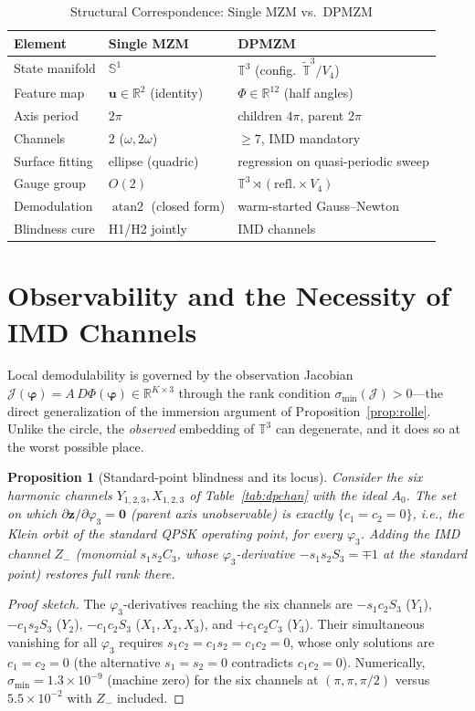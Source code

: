 \documentclass[journal]{IEEEtran}
\newtheorem{proposition}{Proposition}
\newcommand{\zv}{\mathbf{z}}
\newcommand{\uv}{\mathbf{u}}
\newcommand{\phiv}{\bm{\varphi}}
\newcommand{\Jc}{\mathcal{J}}
\newcommand{\atan}{\operatorname{atan2}}
\begin{document}
\begin{table}[!t]
\caption{Structural Correspondence: Single MZM vs.\ DPMZM}
\label{tab:struct}
\centering
\footnotesize
\setlength{\tabcolsep}{4pt}
\begin{tabular}{lll}
\toprule
Element & Single MZM & DPMZM\\
\midrule
State manifold & $\mathbb{S}^1$ & $\mathbb{T}^3$ (config.\ $\widetilde{\mathbb{T}}^3/V_4$)\\
Feature map & $\uv\in\mathbb{R}^2$ (identity) & $\Phi\in\mathbb{R}^{12}$ (half angles)\\
Axis period & $2\pi$ & children $4\pi$, parent $2\pi$\\
Channels & 2 ($\omega,2\omega$) & $\ge 7$, IMD mandatory\\
Surface fitting & ellipse (quadric) & regression on quasi-periodic sweep\\
Gauge group & $O(2)$ & $\mathbb{T}^3\rtimes(\text{refl.}\times V_4)$\\
Demodulation & $\atan$ (closed form) & warm-started Gauss--Newton\\
Blindness cure & H1/H2 jointly & IMD channels\\
\bottomrule
\end{tabular}
\end{table}

\section{Observability and the Necessity of IMD Channels}
\label{sec:obs}
Local demodulability is governed by the observation Jacobian
$\Jc(\phiv)=A\,D\Phi(\phiv)\in\mathbb{R}^{K\times3}$ through the rank
condition $\sigma_{\min}(\Jc)>0$---the direct generalization of the
immersion argument of Proposition~\ref{prop:rolle}. Unlike the circle,
the \emph{observed} embedding of $\mathbb{T}^3$ can degenerate, and it
does so at the worst possible place.

\begin{proposition}[Standard-point blindness and its locus]
\label{prop:blind}
Consider the six harmonic channels $Y_{1,2,3},X_{1,2,3}$ of
Table~\ref{tab:dpchan} with the ideal $A_0$. The set on which
$\partial\zv/\partial\varphi_3=\mathbf{0}$ (parent axis unobservable)
is exactly $\{c_1=c_2=0\}$, i.e., \emph{the Klein orbit of the standard
QPSK operating point}, for every $\varphi_3$. Adding the IMD channel
$Z_-$ (monomial $s_1s_2C_3$, whose $\varphi_3$-derivative
$-s_1s_2S_3=\mp1$ at the standard point) restores full rank there.
\end{proposition}
\begin{proof}[Proof sketch]
The $\varphi_3$-derivatives reaching the six channels are
$-s_1c_2S_3$ ($Y_1$), $-c_1s_2S_3$ ($Y_2$), $-c_1c_2S_3$
($X_1,X_2,X_3$), and $+c_1c_2C_3$ ($Y_3$). Their simultaneous vanishing
for all $\varphi_3$ requires $s_1c_2=c_1s_2=c_1c_2=0$, whose only
solutions are $c_1=c_2=0$ (the alternative $s_1=s_2=0$ contradicts
$c_1c_2=0$). Numerically,
$\sigma_{\min}=1.3\times10^{-9}$ (machine zero) for the six channels at
$(\pi,\pi,\pi/2)$ versus $5.5\times10^{-2}$ with $Z_-$ included.
\end{proof}
\end{document}
